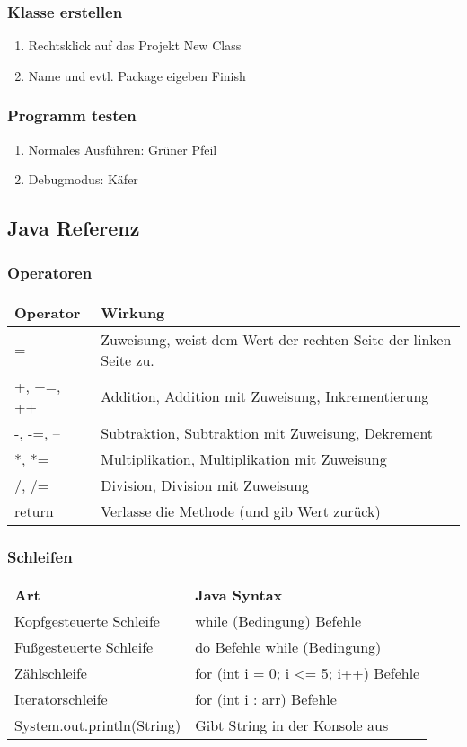 		\subsubsection{Klasse erstellen}
		\begin{enumerate}
		\item Rechtsklick auf das Projekt \frqq New \frqq Class
		\item Name und evtl. Package eigeben \frqq Finish
		\end{enumerate}

		\subsubsection{Programm testen}
		\begin{enumerate}
		\item Normales Ausführen: Grüner Pfeil
		\item Debugmodus: Käfer
		\end{enumerate}

	\subsection{Java Referenz}
		\subsubsection{Operatoren}
		\begin{tabular}{ll}
		\textbf{Operator} & \textbf{Wirkung}\\
		\hline
		= & Zuweisung, weist dem Wert der rechten Seite der linken Seite zu.\\
		+, +=, ++ & Addition, Addition mit Zuweisung, Inkrementierung\\
		-, -=, -- & Subtraktion, Subtraktion mit Zuweisung, Dekrement\\
		*, *= & Multiplikation, Multiplikation mit Zuweisung\\
		/, /= & Division, Division mit Zuweisung\\
		return & Verlasse die Methode (und gib Wert zurück)\\
		\end{tabular}

		\subsubsection{Schleifen}
		\begin{tabular}{ll}
		\textbf{Art} & \textbf{Java Syntax}\\
		Kopfgesteuerte Schleife & while (Bedingung) {Befehle}\\
		Fußgesteuerte Schleife & do {Befehle} while (Bedingung)\\
		Zählschleife & for (int i = 0; i <= 5; i++) {Befehle}\\
		Iteratorschleife & for (int i : arr) {Befehle}\\
		\hline
		System.out.println(String) & Gibt String in der Konsole aus\\
		
		\end{tabular}

